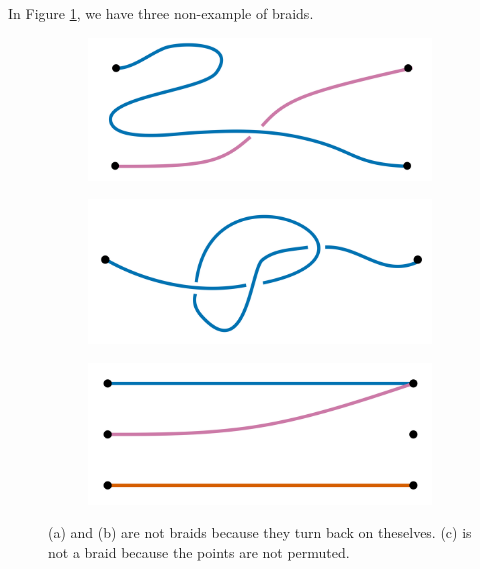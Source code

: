 \documentclass{amsart}
\begin{document}
\begin{example}
	In Figure \ref{falsebraids}, we have three non-example of braids.
	\begin{figure}[!h]
		\begin{subfigure}{.33\textwidth}
			\centering
			\includegraphics[width=.9\linewidth]{Inkscape Files/notbraid.png}
			\caption{}
		\end{subfigure}%
		\begin{subfigure}{.33\textwidth}
			\centering
			\includegraphics[width=.9\linewidth]{Inkscape Files/fancynotbraid.png}
			\caption{}
		\end{subfigure}%
		\begin{subfigure}{.33\textwidth}
			\centering
			\includegraphics[width=.9\linewidth]{Inkscape Files/notbraid2.png}
			\caption{}
		\end{subfigure}
		\caption{(a) and (b) are not braids because they turn back on theselves. (c)
		is not a braid because the points are not permuted.}
		\label{falsebraids}
	\end{figure}
\end{example}
\end{document}
